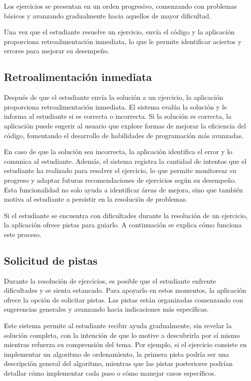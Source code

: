 \documentclass{article}
\begin{document}
Los ejercicios se presentan en un orden progresivo, comenzando con problemas básicos y avanzando gradualmente hacia aquellos de mayor dificultad.

Una vez que el estudiante resuelve un ejercicio, envía el código y la aplicación proporciona retroalimentación inmediata, lo que le permite identificar aciertos y errores para mejorar su desempeño.

\subsection{Retroalimentación inmediata}

Después de que el estudiante envía la solución a un ejercicio, la aplicación proporciona retroalimentación inmediata. El sistema evalúa la solución y le informa al estudiante si es correcta o incorrecta. Si la solución es correcta, la aplicación puede sugerir al usuario que explore formas de mejorar la eficiencia del código, fomentando el desarrollo de habilidades de programación más avanzadas.

En caso de que la solución sea incorrecta, la aplicación identifica el error y lo comunica al estudiante. Además, el sistema registra la cantidad de intentos que el estudiante ha realizado para resolver el ejercicio, lo que permite monitorear su progreso y adaptar futuras recomendaciones de ejercicios según su desempeño. Esta funcionalidad no solo ayuda a identificar áreas de mejora, sino que también motiva al estudiante a persistir en la resolución de problemas.

Si el estudiante se encuentra con dificultades durante la resolución de un ejercicio, la aplicación ofrece pistas para guiarlo. A continuación se explica cómo funciona este proceso.

\subsection{Solicitud de pistas}

Durante la resolución de ejercicios, es posible que el estudiante enfrente dificultades y se sienta estancado. Para apoyarlo en estos momentos, la aplicación ofrece la opción de solicitar pistas. Las pistas están organizadas comenzando con sugerencias generales y avanzando hacia indicaciones más específicas. 

Este sistema permite al estudiante recibir ayuda gradualmente, sin revelar la solución completa, con la intención de que lo motive a descubrirla por sí mismo mientras refuerza su comprensión del tema. Por ejemplo, si el ejercicio consiste en implementar un algoritmo de ordenamiento, la primera pista podría ser una descripción general del algoritmo, mientras que las pistas posteriores podrían detallar cómo implementar cada paso o cómo manejar casos específicos.
\end{document}
